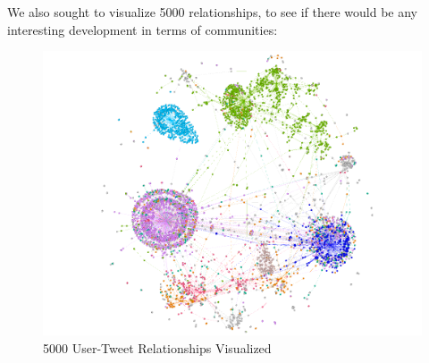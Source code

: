 \documentclass{article}
\begin{document}
We also sought to visualize 5000 relationships, to see if there would be any interesting development in terms of communities:
\begin{figure}[h!]
    \centering
    \includegraphics[width=0.8\linewidth]{Graph Analytics/5kwide.png}
    \caption{5000 User-Tweet Relationships Visualized}
    \label{fig:enter-label}
\end{figure} 
\end{document}
